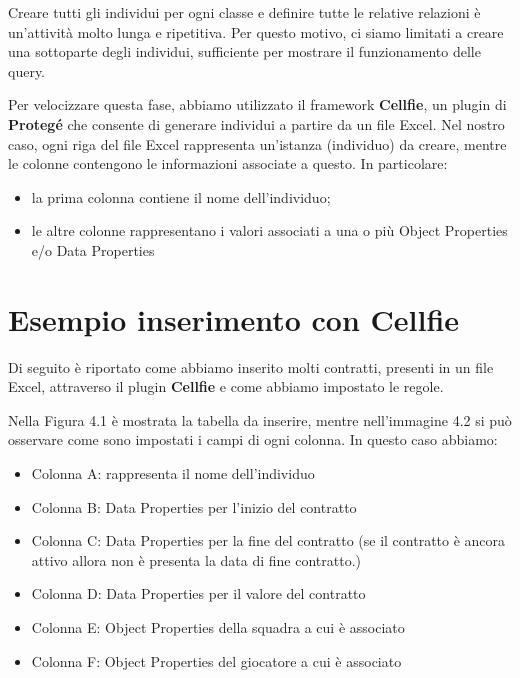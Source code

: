 \documentclass[11pt]{report} %
\begin{document}
\begin{itemize}[leftmargin=*]
Creare tutti gli individui per ogni classe e definire tutte le relative relazioni è un'attività molto lunga e ripetitiva. Per questo motivo, ci siamo limitati a creare una sottoparte degli individui, sufficiente per mostrare il funzionamento delle query.

\hfill

Per velocizzare questa fase, abbiamo utilizzato il framework \textbf{Cellfie}, un plugin di \textbf{Protegé} che consente di generare individui a partire da un file Excel.
Nel nostro caso, ogni riga del file Excel rappresenta un'istanza (individuo) da creare, mentre le colonne contengono le informazioni associate a questo. In particolare:

\begin{itemize}
\item la prima colonna contiene il nome dell'individuo;
\item le altre colonne rappresentano i valori associati a una o più Object Properties e/o Data Properties
\end{itemize}
\newpage
\section{Esempio inserimento con Cellfie}
Di seguito è riportato come abbiamo inserito molti contratti, presenti in un file Excel, attraverso il plugin \textbf{Cellfie} e come abbiamo impostato le regole.

\hfill

Nella Figura 4.1 è mostrata la tabella da inserire, mentre nell'immagine 4.2 si può osservare come sono impostati i campi di ogni colonna.
In questo caso abbiamo:
\begin{itemize}
    \item Colonna A: rappresenta il nome dell'individuo
    \item Colonna B: Data Properties per l'inizio del contratto
    \item Colonna C: Data Properties per la fine del contratto (se il contratto è ancora attivo allora non è presenta la data di fine contratto.)
    \item Colonna D: Data Properties per il valore del contratto
    \item Colonna E: Object Properties della squadra a cui è associato
    \item Colonna F: Object Properties del giocatore a cui è associato
\end{itemize}

\hfill


\end{itemize}
\end{document}
